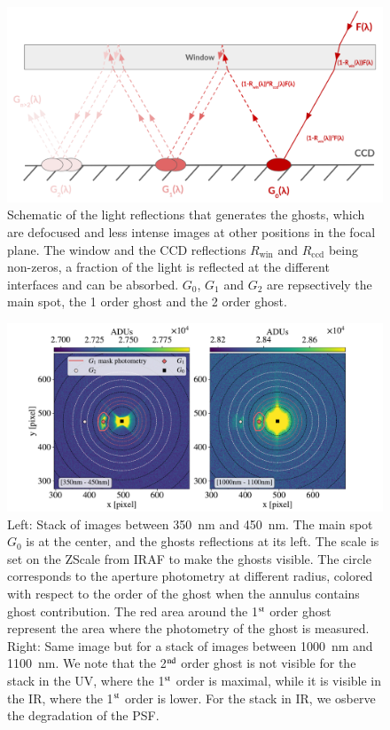 \begin{figure}[h]
    \centering
    \includegraphics[width=\columnwidth]{fig/schema_ghost.pdf}
    \caption{Schematic of the light reflections that generates the ghosts, which are defocused and less intense images at other positions in the focal plane. The window and the CCD reflections $R_\mathrm{win}$ and $R_\mathrm{ccd}$ being non-zeros, a fraction of the light is reflected at the different interfaces and can be absorbed. $G_0$, $G_1$ and $G_2$ are repsectively the main spot, the 1 order ghost and the 2 order ghost.}
    \label{fig:schema_ghost}
\end{figure}

\begin{figure}[h]
    \centering
    \includegraphics[width=\columnwidth]{fig/ghost_contrast.pdf}
    \caption{Left: Stack of images between \SI{350}{\nano\meter} and \SI{450}{\nano\meter}. The main spot $G_0$ is at the center, and the ghosts reflections at its left. The scale is set on the ZScale from IRAF to make the ghosts visible. The circle corresponds to the aperture photometry at different radius, colored with respect to the order of the ghost when the annulus contains ghost contribution. The red area around the 1$\textsuperscript{st}$ order ghost represent the area where the photometry of the ghost is measured. Right: Same image but for a stack of images between \SI{1000}{\nano\meter} and \SI{1100}{\nano\meter}. We note that the 2$\textsuperscript{nd}$ order ghost is not visible for the stack in the UV, where the 1$\textsuperscript{st}$ order is maximal, while it is visible in the IR, where the 1$\textsuperscript{st}$ order is lower. For the stack in IR, we osberve the degradation of the \SD PSF.}
    \label{fig:ghost_contrast}
\end{figure}

